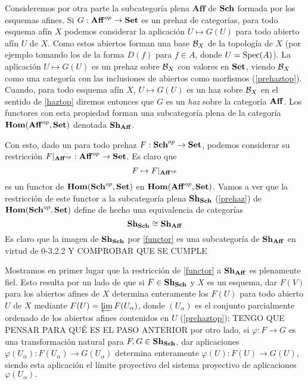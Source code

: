 \documentclass[twoside]{article}
\begin{document}
Consideremos por otra parte la subcategoría plena $\mathrm{\mathbf{Aff}}$ de $\mathrm{\mathbf{Sch}}$ formada por los esquemas afines. Si $G:\mathrm{\mathbf{Aff}}^{op}\to\mathrm{\mathbf{Set}}$ es un prehaz de categorías, para todo esquema afín $X$ podemos considerar la aplicación $U\mapsto G(U)$ para todo abierto afín $U$ de $X$. Como estos abiertos forman una base ${\mathcal B}_X$ de la topología de $X$ (por ejemplo tomando los de la forma $D(f)$ para $f\in A$, donde $U=\operatorname{Spec}(A)$). La aplicación $U\mapsto G(U)$ es un prehaz sobre ${\mathcal B}_X$ con valores en $\mathrm{\mathbf{Set}}$, viendo ${\mathcal B}_X$ como una categoría con las inclusiones de abiertos como morfismos (\ref{prehaztop}). Cuando, para todo esquema afín $X$, $U\mapsto G(U)$ es un haz sobre ${\mathcal B}_X$ en el sentido de \ref{haztop} diremos entonces que $G$ es un \emph{haz} sobre la categoría $\mathrm{\mathbf{Aff}}$. Los functores con esta propiedad forman una subcategoría plena de la categoría $\mathrm{\mathbf{Hom}}(\mathrm{\mathbf{Aff}}^{op},\mathrm{\mathbf{Set}})$ denotada $\mathrm{\mathbf{Sh}}_{\mathrm{\mathbf{Aff}}}$. 

Con esto, dado un para todo prehaz $F:\mathrm{\mathbf{Sch}}^{op}\to \mathrm{\mathbf{Set}}$, podemos considerar su restricción $F|_{\mathrm{\mathbf{Aff}}^{op}}:\mathrm{\mathbf{Aff}}^{op}\to\mathrm{\mathbf{Set}}$. Es claro que
\begin{equation}\label{functor}
F\mapsto F|_{\mathrm{\mathbf{Aff}}^{op}}
\end{equation}
es un functor de $\mathrm{\mathbf{Hom}}(\mathrm{\mathbf{Sch}}^{op},\mathrm{\mathbf{Set}})$ en $\mathrm{\mathbf{Hom}}(\mathrm{\mathbf{Aff}}^{op},\mathrm{\mathbf{Set}})$. Vamos a ver que la restricción de este functor a la subcategoría plena $\mathrm{\mathbf{Sh}}_{\mathrm{\mathbf{Sch}}}$ (\ref{prehaz}) de $\mathrm{\mathbf{Hom}}(\mathrm{\mathbf{Sch}}^{op},\mathrm{\mathbf{Set}})$ define de hecho una equivalencia de categorías 
\begin{equation}\label{equivalencia}
\mathrm{\mathbf{Sh}}_{\mathrm{\mathbf{Sch}}}\cong\mathrm{\mathbf{Sh}}_{\mathrm{\mathbf{Aff}}}
\end{equation}
Es claro que la imagen de $\mathrm{\mathbf{Sh}}_{\mathrm{\mathbf{Sch}}}$ por \ref{functor} es una subcategoría de $\mathrm{\mathbf{Sh}}_{\mathrm{\mathbf{Aff}}}$ en virtud de 0-3.2.2 Y COMPROBAR QUE SE CUMPLE

Mostramos en primer lugar que la restricción de \ref{functor} a $\mathrm{\mathbf{Sh}}_{\mathrm{\mathbf{Aff}}}$ es plenamente fiel. Esto resulta por un lado de que si $F\in \mathrm{\mathbf{Sh}}_{\mathrm{\mathbf{Sch}}}$ y $X$ es un esquema, dar $F(V)$ para los abiertos afines de $X$ determina enteramente los $F(U)$ para todo abierto $U$ de $X$ mediante $F(U)=\varprojlim F(U_\alpha)$, donde $(U_\alpha)$ es el conjunto parcialmente ordenado de los abiertos afines contenidos en $U$ (\ref{prehaztop}); TENGO QUE PENSAR PARA QUÉ ES EL PASO ANTERIOR
 por otro lado, si $\varphi:F\to G$ es una transformación natural para $F,G\in \mathrm{\mathbf{Sh}}_{\mathrm{\mathbf{Sch}}}$, dar aplicaciones $\varphi(U_\alpha):F(U_\alpha)\to G(U_\alpha)$ determina enteramente $\varphi(U):F(U)\to G(U)$, siendo esta aplicación el límite proyectivo del sistema proyectivo de aplicaciones $\varphi(U_\alpha).$%
 
\end{document}
